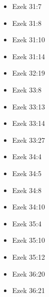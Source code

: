\documentclass[14pt]{book}
\begin{document}
\begin{multicols}{2}
\begin{itemize}
														\item Ezek 31:7
														
														\item Ezek 31:8
														
														\item Ezek 31:10
														
														\item Ezek 31:14
														
														\item Ezek 32:19
														
														\item Ezek 33:8
														
														\item Ezek 33:13
														
														\item Ezek 33:14
														
														\item Ezek 33:27
														
														\item Ezek 34:4
														
														\item Ezek 34:5
														
														\item Ezek 34:8
														
														\item Ezek 34:10
														
														\item Ezek 35:4
														
														\item Ezek 35:10
														
														\item Ezek 35:12
														
														\item Ezek 36:20
														
														\item Ezek 36:21
														

\end{itemize}
\end{multicols}
\end{document}
